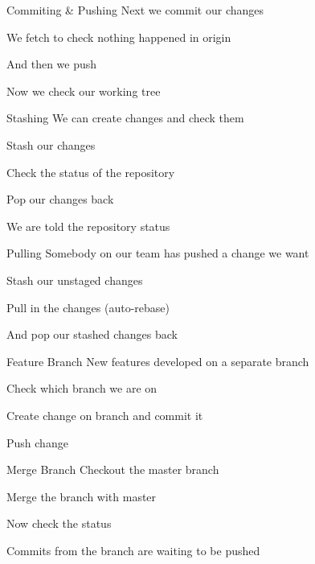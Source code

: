 \documentclass{beamer}
\begin{document}
  \begin{frame}[fragile=singleslide]{Commiting \& Pushing}
    Next we commit our changes
    
    We fetch to check nothing happened in origin
    
  \end{frame}
  \begin{frame}[fragile=singleslide]
    And then we push
    
    Now we check our working tree
    
  \end{frame}
  \begin{frame}[fragile=singleslide]{Stashing}
    We can create changes and check them
    
  \end{frame}
  \begin{frame}[fragile=singleslide]
    Stash our changes
    
    Check the status of the repository
    
  \end{frame}
  \begin{frame}[fragile=singleslide]
    Pop our changes back
    
    We are told the repository status
  \end{frame}
  \begin{frame}[fragile=singleslide]{Pulling}
    Somebody on our team has pushed a change we want
    
    Stash our unstaged changes
    
  \end{frame}
  \begin{frame}[fragile=singleslide]
    Pull in the changes (auto-rebase)
    
  \end{frame}
  \begin{frame}[fragile=singleslide]
    And pop our stashed changes back
    
  \end{frame}
  \begin{frame}[fragile=singleslide]{Feature Branch}
    New features developed on a separate branch
    
    Check which branch we are on
    
  \end{frame}
  \begin{frame}[fragile=singleslide]
    Create change on branch and commit it
    
    Push change
    
  \end{frame}
  \begin{frame}[fragile=singleslide]{Merge Branch}
    Checkout the master branch
    
    Merge the branch with master
    
  \end{frame}
  \begin{frame}[fragile=singleslide]
    Now check the status
    
    Commits from the branch are waiting to be pushed
  \end{frame}
\end{document}
